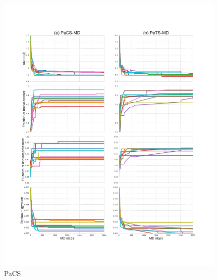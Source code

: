 
\begin{figure}[ht]
\begin{minipage}[b]{0.49\textwidth}
\centering
\includegraphics[width=1.0\textwidth]{Figures/chig_plot_both.pdf}
\caption{PaCS}
\label{fig:result_pacs_plot}
\end{minipage}
\begin{minipage}[b]{0.49\textwidth}
\centering

\end{minipage}
\end{figure}
